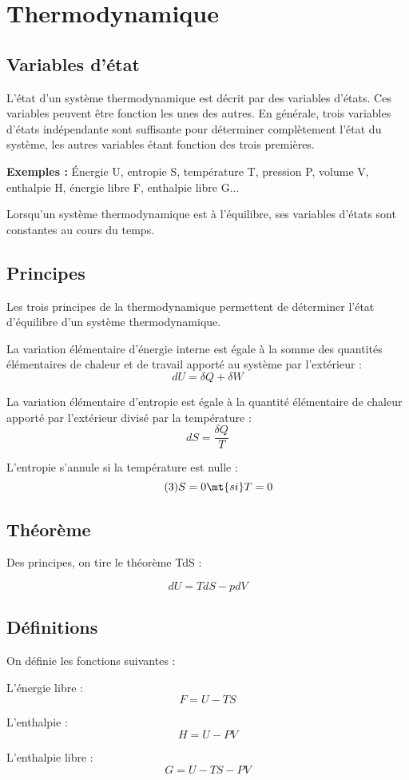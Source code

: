 \chapter{Thermodynamique}

\section{Variables d'état}
L'état d'un système thermodynamique est décrit par des variables d'états. Ces variables peuvent être fonction les unes des autres. En générale, trois variables d'états indépendante sont suffisante pour déterminer complètement l'état du système, les autres variables étant fonction des trois premières.

{\bf Exemples : }
Énergie U, entropie S, température T,  pression P, volume V, enthalpie H, énergie libre F, enthalpie libre G...

Lorsqu'un système thermodynamique est à l'équilibre, ses variables d'états sont constantes au cours du temps.

\section{Principes}

Les trois principes de la thermodynamique permettent de déterminer l'état d'équilibre d'un système thermodynamique.

La variation élémentaire d'énergie interne est égale à la somme des quantités élémentaires de chaleur et de travail apporté au système par l'extérieur :
\[
\tag{1}dU = \delta Q + \delta W
\]

La variation élémentaire d'entropie est égale à la quantité élémentaire de chaleur apporté par l'extérieur divisé par la température :
\[
\tag{2}dS = \frac{\delta Q}{T}
\]

L'entropie s'annule si la température est nulle :
\[
\tag{3}S = 0 \mt{ si } T=0
\]

\section{Théorème}
\begin{minipage}[c]{.45\linewidth}
Des principes, on tire le théorème TdS :
\end{minipage}
\hfill
\begin{minipage}[c]{.45\linewidth}
\[
dU = TdS - pdV
\]
\end{minipage}

\section{Définitions}
On définie les fonctions suivantes :

L'énergie libre : 
\[
F=U-TS
\]

L'enthalpie :
\[
H=U-PV
\]

L'enthalpie libre :
\[
G = U-TS-PV
\]

